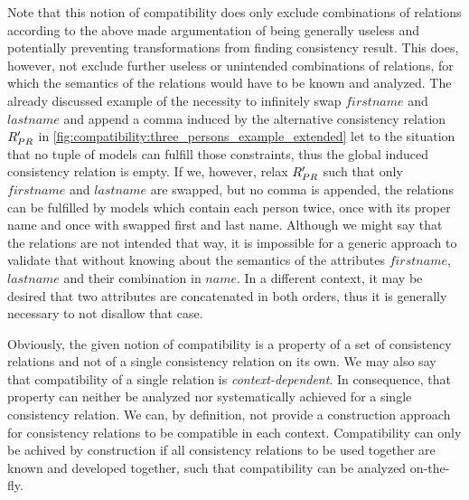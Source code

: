 Note that this notion of compatibility does only exclude combinations of relations according to the above made argumentation of being generally useless and potentially preventing transformations from finding consistency result.
This does, however, not exclude further useless or unintended combinations of relations, for which the semantics of the relations would have to be known and analyzed.
The already discussed example of the necessity to infinitely swap $firstname$ and $lastname$ and append a comma induced by the alternative consistency relation $R_{PR}'$ in \autoref{fig:compatibility:three_persons_example_extended} let to the situation that no tuple of models can fulfill those constraints, thus the global induced consistency relation is empty.
If we, however, relax $R_{PR}'$ such that only $firstname$ and $lastname$ are swapped, but no comma is appended, the relations can be fulfilled by models which contain each person twice, once with its proper name and once with swapped first and last name.
Although we might say that the relations are not intended that way, it is impossible for a generic approach to validate that without knowing about the semantics of the attributes $firstname$, $lastname$ and their combination in $name$.
In a different context, it may be desired that two attributes are concatenated in both orders, thus it is generally necessary to not disallow that case.

Obviously, the given notion of compatibility is a property of a set of consistency relations and not of a single consistency relation on its own.
We may also say that compatibility of a single relation is \emph{context-dependent}.
In consequence, that property can neither be analyzed nor systematically achieved for a single consistency relation.
We can, by definition, not provide a construction approach for consistency relations to be compatible in each context.
Compatibility can only be achived by construction if all consistency relations to be used together are known and developed together, such that compatibility can be analyzed on-the-fly.

